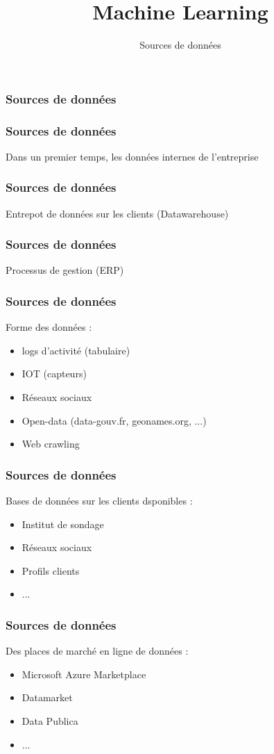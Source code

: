 \documentclass{formation}
\title{Machine Learning}
\subtitle{Sources de données}
\begin{document}
\maketitle

\begin{frame}
  \frametitle{Sources de données}
\end{frame}

\begin{frame}
  \frametitle{Sources de données}
  Dans un premier temps, les données internes de l'entreprise
\end{frame}

\begin{frame}
  \frametitle{Sources de données}
  Entrepot de données sur les clients (Datawarehouse)
\end{frame}

\begin{frame}
  \frametitle{Sources de données}
  Processus de gestion (ERP)
\end{frame}

\begin{frame}
  \frametitle{Sources de données}
  Forme des données :
  \begin{itemize}
  \item logs d'activité (tabulaire)
  \item IOT (capteurs)
  \item Réseaux sociaux
  \item Open-data (data-gouv.fr, geonames.org, ...)
  \item Web crawling 
  \end{itemize}

\end{frame}

\begin{frame}
  \frametitle{Sources de données}
  Bases de données sur les clients dsponibles :
  \begin{itemize}
  \item Institut de sondage
  \item Réseaux sociaux
  \item Profils clients
  \item ...
  \end{itemize}
\end{frame}
    
\begin{frame}
  \frametitle{Sources de données}
  Des places de marché en ligne de données :
  \begin{itemize}
  \item Microsoft Azure Marketplace
  \item Datamarket
  \item Data Publica
  \item ...
  \end{itemize}
\end{frame}
\end{document}
